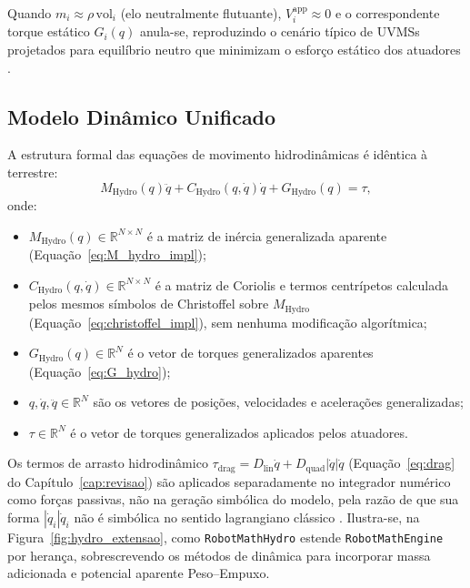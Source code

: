 Quando $m_i \approx \rho\, \text{vol}_i$ (elo neutralmente flutuante), $V_i^{\text{app}} \approx 0$ e o correspondente torque estático $G_i(q)$ anula-se, reproduzindo o cenário típico de UVMSs projetados para equilíbrio neutro que minimizam o esforço estático dos atuadores \cite{antonelli2014modelling, yuh2001underwater}.

\subsection{Modelo Dinâmico Unificado}

A estrutura formal das equações de movimento hidrodinâmicas é idêntica à terrestre:
\begin{equation}
    M_{\text{Hydro}}(q)\ddot{q} + C_{\text{Hydro}}(q,\dot{q})\dot{q} + G_{\text{Hydro}}(q) = \tau,
    \label{eq:EOM_hydro}
\end{equation}
onde:
\begin{itemize}
    \item $M_{\text{Hydro}}(q) \in \mathbb{R}^{N\times N}$ é a matriz de inércia generalizada aparente (Equação~\eqref{eq:M_hydro_impl});
    \item $C_{\text{Hydro}}(q,\dot{q}) \in \mathbb{R}^{N\times N}$ é a matriz de Coriolis e termos centrípetos calculada pelos mesmos símbolos de Christoffel sobre $M_{\text{Hydro}}$ (Equação~\eqref{eq:christoffel_impl}), sem nenhuma modificação algorítmica;
    \item $G_{\text{Hydro}}(q) \in \mathbb{R}^{N}$ é o vetor de torques generalizados aparentes (Equação~\eqref{eq:G_hydro});
    \item $q, \dot{q}, \ddot{q} \in \mathbb{R}^{N}$ são os vetores de posições, velocidades e acelerações generalizadas;
    \item $\tau \in \mathbb{R}^{N}$ é o vetor de torques generalizados aplicados pelos atuadores.
\end{itemize} Os termos de arrasto hidrodinâmico $\tau_{\text{drag}} = D_{\text{lin}}\dot{q} + D_{\text{quad}}|\dot{q}|\dot{q}$ (Equação~\eqref{eq:drag} do Capítulo~\ref{cap:revisao}) são aplicados separadamente no integrador numérico como forças passivas, não na geração simbólica do modelo, pela razão de que sua forma $|\dot{q}_i|\dot{q}_i$ não é simbólica no sentido lagrangiano clássico \cite{fossen2011handbook}. Ilustra-se, na Figura~\ref{fig:hydro_extensao}, como \texttt{RobotMathHydro} estende \texttt{RobotMathEngine} por herança, sobrescrevendo os métodos de dinâmica para incorporar massa adicionada e potencial aparente Peso--Empuxo.

